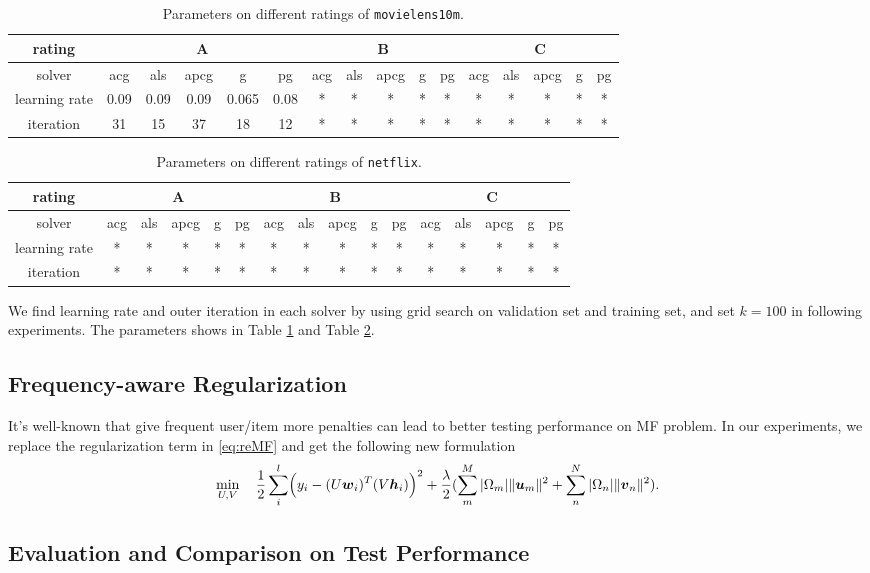 \documentclass[11pt,twoside]{article}
\newcommand{\bsym}[1]{\ensuremath{\boldsymbol{#1}}}
\newcommand{\bw}{\ensuremath{\bsym{w}}}
\newcommand{\bh}{\ensuremath{\bsym{h}}}
\newcommand{\bu}{\ensuremath{\bsym{u}}}
\newcommand{\bv}{\ensuremath{\bsym{v}}}
\begin{document}
\begin{table}[H]
    \centering    
    \begin{tabular}{c|ccccc|ccccc|ccccc}
rating        & \multicolumn{5}{c|}{A}            & \multicolumn{5}{c|}{B}    & \multicolumn{5}{c}{C}     \\ \hline
solver        & acg  & als  & apcg & g     & pg   & acg & als & apcg & g & pg & acg & als & apcg & g & pg \\ \hline
learning rate & 0.09 & 0.09 & 0.09 & 0.065 & 0.08 & *   & *   & *    & * & *  & *   & *   & *    & * & *  \\
iteration     & 31   & 15   & 37   & 18    & 12   & *   & *   & *    & * & *  & *   & *   & *    & * & * 
\end{tabular}
    \caption{Parameters on different ratings of {\tt movielens10m}.}
    \label{tab:parameters_ml}
\end{table}
\begin{table}[H]
    \centering    
    \begin{tabular}{c|ccccc|ccccc|ccccc}
rating        & \multicolumn{5}{c|}{A}    & \multicolumn{5}{c|}{B}    & \multicolumn{5}{c}{C}     \\ \hline
solver        & acg & als & apcg & g & pg & acg & als & apcg & g & pg & acg & als & apcg & g & pg \\ \hline
learning rate & *   & *   & *    & * & *  & *   & *   & *    & * & *  & *   & *   & *    & * & *  \\
iteration     & *   & *   & *    & * & *  & *   & *   & *    & * & *  & *   & *   & *    & * & * 
\end{tabular}
    \caption{Parameters on different ratings of {\tt netflix}.}
    \label{tab:parameters_nf}
\end{table}
We find learning rate and outer iteration in each solver by using grid search on validation set and training set, and set $k=100$ in following experiments. The parameters shows in Table \ref{tab:parameters_ml} and Table \ref{tab:parameters_nf}.

\subsection{Frequency-aware Regularization}
It's well-known that give frequent user/item more penalties can lead to better testing performance on MF problem. In our experiments, we replace the regularization term in \eqref{eq:reMF} and get the following new formulation
\begin{equation}
    \min_{U,V}  \quad \frac{1}{2}\sum_{i}^l  \Bigl(y_i - (U \bw_i)^T (V \bh_i)\Bigr)^2+
    \frac{\lambda}{2} (\sum^{M}_m |\Omega_{m}| \|\bu_m\|^2 +\sum^{N}_{n} |\Omega_{n}| \|\bv_n\|^2).
    \label{eq:faMF}
\end{equation}
\subsection{Evaluation and Comparison on Test Performance}

\clearpage\newpage


%
\end{document}
